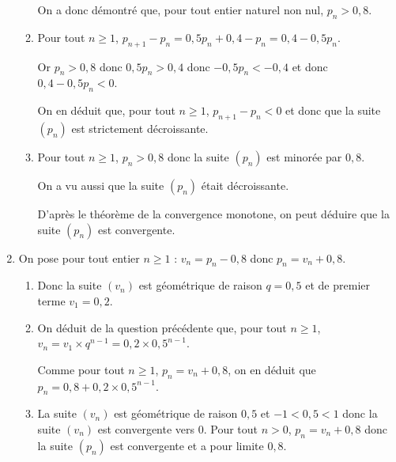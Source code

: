 \documentclass[10pt]{article}
\begin{document}
\begin{enumerate}
\begin{enumerate}
On a donc démontré que, pour tout entier naturel non nul, $p_n >0,8$.
		
		\item %
Pour tout $n\geqslant 1$, $p_{n+1}-p_{n} = 0,5p_n+0,4-p_n = 0,4-0,5p_n$.

Or $p_n>0,8$ donc $0,5p_n>0,4$ donc $-0,5p_n<-0,4$ et donc $0,4-0,5p_n<0$.

On en déduit que, pour tout $n\geqslant 1$, $p_{n+1}-p_n<0$ et donc que la suite $(p_n)$ est strictement décroissante.		
				
		\item%
Pour tout $n\geqslant 1$, $p_n>0,8$ donc la suite $(p_n)$ est minorée par $0,8$.

On a vu aussi que la suite $(p_n)$ était décroissante.

D'après le théorème de la convergence monotone, on peut déduire que la suite $(p_n)$ est convergente.		
		
		
 	\end{enumerate}
\item On pose pour tout entier $n \geqslant 1$ : $v_n = p_n - 0,8$ donc $p_n=v_n+0,8$.
	\begin{enumerate}
		\item %
		
Donc la suite $(v_n)$ est géométrique de raison $q=0,5$ et de premier terme $v_1=0,2$.		
		
		\item  On déduit de la question précédente que, pour tout $n\geqslant 1$,
		$v_n=v_1\times q^{n-1} = 0,2 \times 0,5^{n-1}$.
		
Comme pour tout $n\geqslant 1$, $p_n=v_n+0,8$, on en déduit que $p_n=0,8+0,2\times 0,5^{n-1}$.

		\item%
La suite $(v_n)$ est géométrique de raison $0,5$ et $-1<0,5<1$ donc la suite $(v_n)$ est convergente vers 0. Pour tout $n>0$, $p_n=v_n+0,8$ donc la suite $(p_n)$ est convergente et a pour limite $0,8$.		
		
		
	\end{enumerate}
\end{enumerate}
\end{document}
